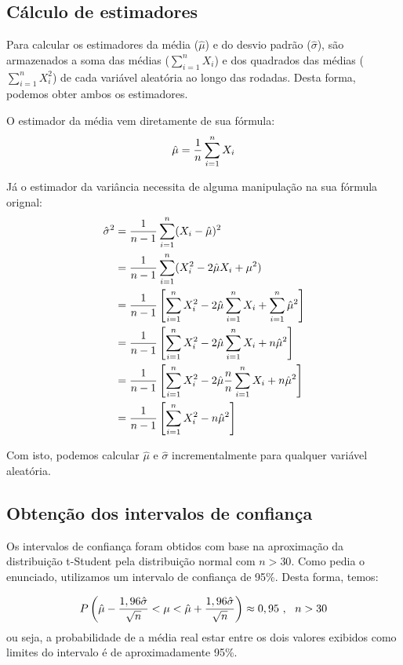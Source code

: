 \documentclass[a4paper,10pt]{article}
\begin{document}
\subsection{Cálculo de estimadores}

Para calcular os estimadores da média ($\hat{\mu}$) e do desvio padrão ($\hat{\sigma}$), são armazenados a soma das médias ($\sum_{i = 1}^n X_i$) e dos quadrados das médias ($\sum_{i = 1}^n X_ i^2$) de cada variável aleatória ao longo das rodadas. Desta forma, podemos obter ambos os estimadores.

O estimador da média vem diretamente de sua fórmula:
\begin{equation}\label{estimadorMedia}
	\hat{\mu} = {{1} \over {n}} \sum_{i = 1}^n X_i
\end{equation}

Já o estimador da variância necessita de alguma manipulação na sua fórmula orignal:
\begin{align}
	\hat{\sigma}^2 &= {{1} \over {n - 1}} \sum_{i = 1}^n (X_i - \hat{\mu})^2 \\
	&= {{1} \over {n - 1}} \sum_{i = 1}^n (X_i^2 - 2 \hat{\mu} X_i + \mu^2) \\
	&= {{1} \over {n - 1}} \left[ \sum_{i = 1}^n X_i^2 - 2 \hat{\mu} \sum_{i = 1}^n X_i + \sum_{i = 1}^n \hat{\mu}^2 \right] \\
	&= {{1} \over {n - 1}} \left[ \sum_{i = 1}^n X_i^2 - 2 \hat{\mu} \sum_{i = 1}^n X_i + n \hat{\mu}^2 \right] \\
	&= {{1} \over {n - 1}} \left[ \sum_{i = 1}^n X_i^2 - 2 \hat{\mu} {{n}\over{n}} \sum_{i = 1}^n X_i + n \hat{\mu}^2 \right] \\
	&= {{1} \over {n - 1}} \left[ \sum_{i = 1}^n X_i^2 - n \hat{\mu}^2 \right]
\end{align}

Com isto, podemos calcular $\hat{\mu}$ e $\hat{\sigma}$ incrementalmente para qualquer variável aleatória.

\subsection{Obtenção dos intervalos de confiança}

Os intervalos de confiança foram obtidos com base na aproximação da distribuição t-Student pela distribuição normal com $n > 30$. Como pedia o enunciado, utilizamos um intervalo de confiança de 95\%. Desta forma, temos:

\begin{equation}
	P \left (\hat{\mu} - {{1,96 \hat{\sigma}} \over {\sqrt{n}}} < \mu < \hat{\mu} + {{1,96 \hat{\sigma}} \over {\sqrt{n}}} \right) \approx 0,95  ~,~~n > 30
\end{equation}
ou seja, a probabilidade de a média real estar entre os dois valores exibidos como limites do intervalo é de aproximadamente 95\%.
\end{document}
